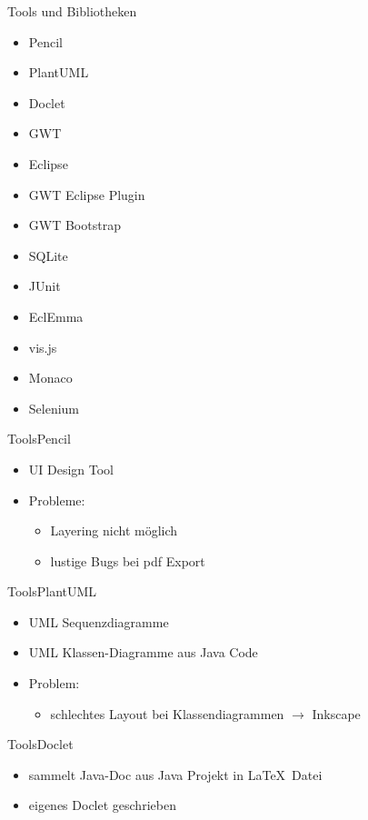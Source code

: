 \documentclass[10pt]{beamer}
\begin{document}
\begin{frame}{Tools und Bibliotheken}{}
	\begin{itemize}
		\item Pencil
		\item PlantUML
		\item Doclet
		\item GWT
		\item Eclipse
		\item GWT Eclipse Plugin
		\item GWT Bootstrap
		\item SQLite
		\item JUnit
		\item EclEmma
		\item vis.js
		\item Monaco
		\item Selenium
	\end{itemize}
\end{frame}

\begin{frame}{Tools}{Pencil}
	\begin{itemize}
		\item UI Design Tool
		\item Probleme:
			\begin{itemize}
				\item Layering nicht möglich
				\item lustige Bugs bei pdf Export
			\end{itemize} 
	\end{itemize}
\end{frame}

\begin{frame}{Tools}{PlantUML}
	\begin{itemize}
		\item UML Sequenzdiagramme
		\item UML Klassen-Diagramme aus Java Code
		\item Problem: 
			\begin{itemize}
				\item schlechtes Layout bei Klassendiagrammen $\rightarrow$ Inkscape
			\end{itemize}
	\end{itemize}
\end{frame}

\begin{frame}{Tools}{Doclet}
	\begin{itemize}
		\item sammelt Java-Doc aus Java Projekt in \LaTeX \ Datei
		\item eigenes Doclet geschrieben
	\end{itemize}
\end{frame}
\end{document}
